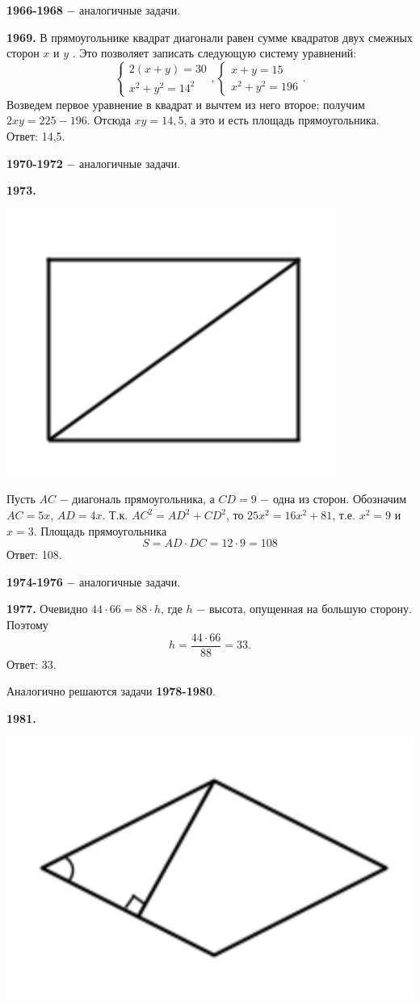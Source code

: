 \textbf{1966-1968} $-$ аналогичные задачи.

\textbf{1969.} В прямоугольнике квадрат диагонали равен сумме квадратов двух смежных сторон $x$ и $y$ .  Это позволяет записать следующую систему уравнений:
\[
\begin{cases} 
	2(x+y)=30\\
	x^2+y^2=14^2
\end{cases},
\begin{cases}
	x+y=15\\
	x^2+y^2=196
\end{cases}.
\]
Возведем первое уравнение в квадрат и вычтем из него второе; получим $2xy=225-196$. Отсюда $xy=14,5$, а это и есть площадь прямоугольника. \newline \null \hspace*{\fill} Ответ: 14,5.

\textbf{1970-1972} $-$ аналогичные задачи.

\clearpage 

\textbf{1973.}

{\centering \includegraphics[width=0.4\linewidth]{Geometry/Content/31.png}
	
}

Пусть $AC$ $-$ диагональ прямоугольника, а $CD = 9$ $-$ одна из сторон. Обозначим $AC = 5x$, $AD = 4x$. Т.к. $AC^2 = AD^2 +CD^2$, то
$25x^2 = 16x^2 +81$, т.е. $x^2=9$ и $x =3$. Площадь прямоугольника
\[
S =AD\cdot DC = 12\cdot 9 =108
\]
\null \hspace*{\fill} Ответ: 108.

\textbf{1974-1976} $-$ аналогичные задачи.

\textbf{1977.} Очевидно $44\cdot 66 = 88\cdot h$, где $h$ $-$ высота, опущенная на большую сторону. Поэтому
\[
h = \frac{44\cdot66}{88} = 33.
\]
\null \hspace*{\fill} Ответ: 33.

Аналогично решаются задачи \textbf{1978-1980}.

\textbf{1981.}

{\centering \includegraphics[width=0.45\linewidth]{Geometry/Content/32.png}
	
}

